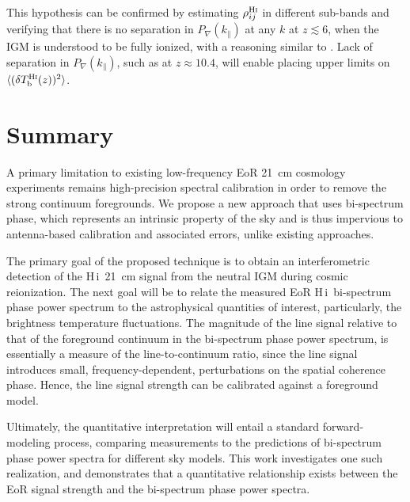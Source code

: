 \documentclass[
reprint,
superscriptaddress,
amsmath,
amssymb,
aps,
prd
]{revtex4-1}
\newcommand{\HI}{H\,{\sc i}}
\begin{document}
This hypothesis can be confirmed by estimating $\rho_{ij}^\textrm{H{\sc i}}$ in different sub-bands and verifying that there is no separation in $P_\nabla(k_\parallel)$ at any $k$ at $z\lesssim 6$, when the IGM is understood to be fully ionized, with a reasoning similar to \cite{pob16b}. Lack of separation in $P_\nabla(k_\parallel)$, such as at $z\approx 10.4$, will enable placing upper limits on $\langle (\delta T_\textrm{b}^\textrm{H{\sc i}}(z))^2\rangle$.

\section{Summary}\label{sec:summary}

A primary limitation to existing low-frequency EoR 21~cm cosmology experiments remains high-precision spectral calibration in order to remove the strong continuum foregrounds. We propose a new approach that uses bi-spectrum phase, which represents an intrinsic property of the sky and is thus impervious to antenna-based calibration and associated errors, unlike existing approaches.
  
The primary goal of the proposed technique is to obtain an interferometric detection of the \HI\ 21~cm signal from the neutral IGM during cosmic reionization. The next goal will be to relate the measured EoR \HI\ bi-spectrum phase power spectrum to the astrophysical quantities of interest, particularly, the brightness temperature fluctuations. The magnitude of the line signal relative to that of the foreground continuum in the bi-spectrum phase power spectrum, is essentially a measure of the line-to-continuum ratio, since the line signal introduces small, frequency-dependent, perturbations on the spatial coherence phase. Hence, the line signal strength can be calibrated against a foreground model.

Ultimately, the quantitative interpretation will entail a standard forward-modeling process, comparing measurements to the predictions of bi-spectrum phase power spectra for different sky models. This work investigates one such realization, and demonstrates that a quantitative relationship exists between the EoR signal strength and the bi-spectrum phase power spectra.
\end{document}
